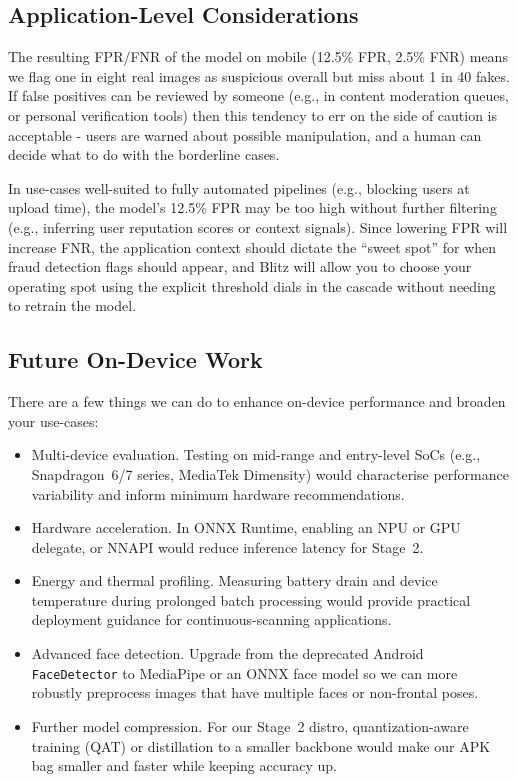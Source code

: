 \subsection*{Application-Level Considerations}
The resulting FPR/FNR of the model on mobile (12.5\% FPR, 2.5\% FNR) means we flag one in eight real images as suspicious overall but miss about 1 in 40 fakes. If false positives can be reviewed by someone (e.g., in content moderation queues, or personal verification tools) then this tendency to err on the side of caution is acceptable - users are warned about possible manipulation, and a human can decide what to do with the borderline cases.

In use\hyp cases well\hyp suited to fully automated pipelines (e.g., blocking users at upload time), the model's 12.5\% FPR may be too high without further filtering (e.g., inferring user reputation scores or context signals). Since lowering FPR will increase FNR, the application context should dictate the ``sweet spot'' for when fraud detection flags should appear, and Blitz will allow you to choose your operating spot using the explicit threshold dials in the cascade without needing to retrain the model.

\subsection*{Future On-Device Work}
There are a few things we can do to enhance on\hyp device performance and broaden your use\hyp cases:
\begin{itemize}[leftmargin=*,itemsep=2pt,parsep=0pt]
  \item Multi\hyp device evaluation. Testing on mid\hyp range and entry\hyp level SoCs (e.g., Snapdragon~6/7 series, MediaTek Dimensity) would characterise performance variability and inform minimum hardware recommendations.
  \item Hardware acceleration. In ONNX Runtime, enabling an NPU or GPU delegate, or NNAPI would reduce inference latency for Stage~2.
  \item Energy and thermal profiling. Measuring battery drain and device temperature during prolonged batch processing would provide practical deployment guidance for continuous\hyp scanning applications.
  \item Advanced face detection. Upgrade from the deprecated Android \texttt{FaceDetector} to MediaPipe or an ONNX face model so we can more robustly preprocess images that have multiple faces or non\hyp frontal poses.
  \item Further model compression. For our Stage~2 distro, quantization\hyp aware training (QAT) or distillation to a smaller backbone would make our APK bag smaller and faster while keeping accuracy up.
\end{itemize}

